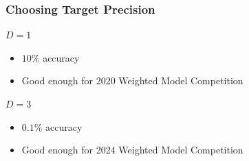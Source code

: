 \documentclass[t,pdf]{beamer}
\begin{document}
\begin{frame}
  \frametitle{Choosing Target Precision}

\bigskip
  $D = 1$
  \begin{itemize}
    \item $10\%$ accuracy
    \item Good enough for 2020 Weighted Model Competition

  \end{itemize}

\bigskip
  $D = 3$
  \begin{itemize}
    \item $0.1\%$ accuracy
    \item Good enough for 2024 Weighted Model Competition
  \end{itemize}

\bigskip
{}

\end{frame}
\end{document}
